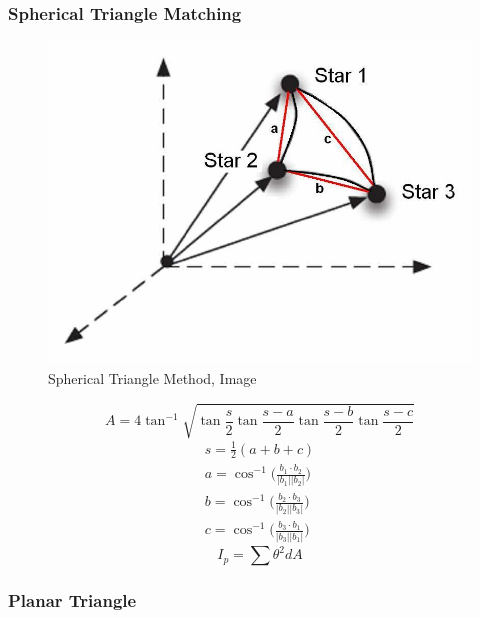 \documentclass[12pt,a4paper,oneside]{article}
\begin{document}
\subsubsection{Spherical Triangle Matching}

\begin{figure}[ht]
\includegraphics[scale=0.29]{spherical_triangle_method.jpg}
\centering
\caption{Spherical Triangle Method, Image \citet{cole2004fast}}
\label{fig:spherical_triangle_method}
\end{figure}

\citet{cole2004fast}

\begin{equation}
A = 4\tan^{-1}\sqrt{\tan\frac{s}{2}\tan\frac{s-a}{2}\tan\frac{s-b}{2}\tan\frac{s-c}{2}}
\end{equation}
\begin{subequations}
\begin{align*}
s = \frac{1}{2}(a + b + c) \\
a = \cos^{-1} \bigg(\frac{b_1 \cdot b_2}{|b_1||b_2|}\bigg) \\
b = \cos^{-1} \bigg(\frac{b_2 \cdot b_3}{|b_2||b_3|}\bigg) \\
c = \cos^{-1} \bigg(\frac{b_3 \cdot b_1}{|b_3||b_1|}\bigg) 
\end{align*}
\end{subequations}
\begin{equation}
I_p = \sum\theta^2dA
\end{equation}
\subsubsection{Planar Triangle}
\end{document}
